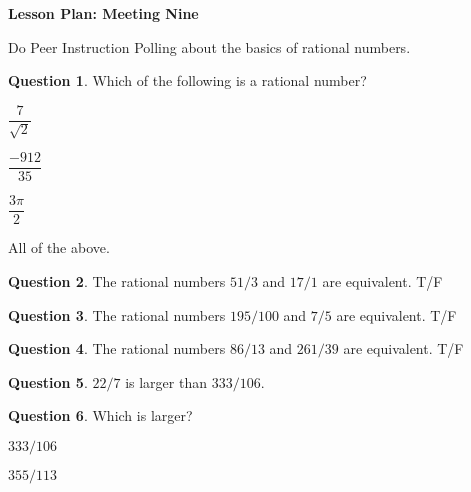 \documentclass[12pt]{amsart}
\theoremstyle{definition}
\newtheorem{question}{Question}
\begin{document}
\begin{center}
\textbf{\Huge
Lesson Plan: Meeting Nine
}
\end{center}
\vspace{.5in}

Do Peer Instruction Polling about the basics of rational numbers.

\begin{question}
Which of the following is a rational number?
\begin{compactitem}
\item $\dfrac{7}{\sqrt{2}}$
\item $\dfrac{-912}{35}$
\item $\dfrac{3\pi}{2}$
\item All of the above.
\end{compactitem}
\end{question}

\begin{question}
The rational numbers $51/3$ and $17/1$ are equivalent. T/F
\end{question}

\begin{question}
The rational numbers $195/100$ and $7/5$ are equivalent. T/F
\end{question}

\begin{question}
The rational numbers $86/13$ and $261/39$ are equivalent. T/F
\end{question}

\begin{question}
$22/7$ is larger than $333/106$.
\end{question}

\begin{question}
Which is larger?
\begin{compactitem}
\item $333/106$
\item $355/113$
\end{compactitem}
\end{question}
\end{document}
